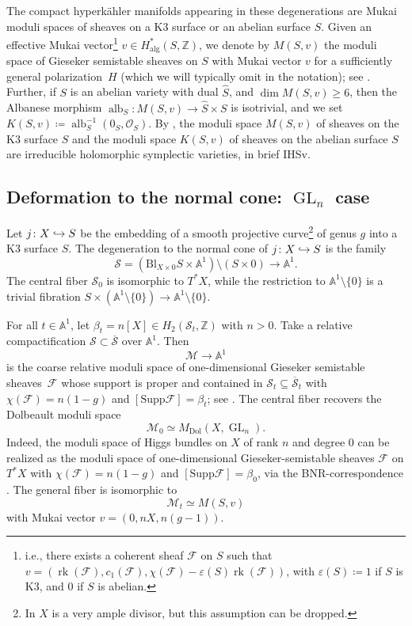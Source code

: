 \documentclass[11pt]{article}
\newcommand{\ie}{i.e.,\xspace}
\let\mathcal\mathscr
\let\epsilon\varepsilon
\newcommand\hto{\mathrel{\lhook\joinrel\to}}
\DeclareMathOperator{\rk}{rk}
\theoremstyle{definition}
\newcommand{\Aff}{\mathbb{A}}
\newcommand{\ZZ}{\mathbb{Z}}
\newcommand{\alb}{\operatorname{alb}}
\newcommand{\Gl}{\operatorname{GL}}
\newcommand{\MDolGl}{{M}_{\mathrm{Dol}}(X, \Gl_n)}
\newcommand{\Mukai}{M(S, v)}
\newcommand{\Kumm}{K(S, v)}
\begin{document}
The compact hyperkähler manifolds appearing in these degenerations are Mukai moduli spaces of sheaves on a K3 surface or an abelian surface $S$. Given an effective Mukai vector\footnote{\ie there exists a coherent sheaf $\mathcal{F}$ on $S$ such that $v = (\rk(\mathcal{F}), c_1(\mathcal{F}), \chi(\mathcal{F})-\epsilon(S)\rk(\mathcal{F}))$, with $\epsilon(S)\coloneqq 1$ if $S$ is K3, and $0$ if $S$ is abelian.} $v \in H^{*}_{\mathrm{alg}}(S, \ZZ)$, we denote by $\Mukai$ the moduli space of Gieseker semistable sheaves on $S$ with Mukai vector $v$
for a sufficiently general polariza\-tion~$H$ (which we will typically omit in the notation); see \cite[\S 1]{Simpson1994I}. Further, if $S$ is an abelian variety with dual $\hat{S}$, and $\dim \Mukai\geq 6$,
then the Albanese morphism
$\alb_S\colon \Mukai \to \hat{S} \times S$
is isotrivial, and we set
$\Kumm \coloneqq \alb_S^{-1}(0_S, \mathcal{O}_S)$. By \cite{PeregoRapagnetta18}, the moduli space $\Mukai$ of sheaves on the K3 surface $S$ and the moduli space $\Kumm$ of sheaves on the abelian surface $S$ are irreducible holomorphic symplectic varieties, in brief IHSv.

\subsection{Deformation to the normal cone: $\Gl_n$ case}
Let $j \colon X \hto S$ be the embedding of a smooth projective curve\footnote{In \cite{DEL97} $X$ is a very ample divisor, but this assumption can be dropped.} of genus $g$ into a K3 surface $S$. The degeneration to the normal cone of $j \colon X \hto S$ is the family
\[
\mathcal{S}=\left(\mathrm{Bl}_{X\times 0}S\times \Aff^1\right)\setminus \left( S\times 0\right)\to \Aff^1.
\]
The central fiber $\mathcal{S}_0$ is isomorphic to $T^*X$, while the restriction to $\Aff^1 \setminus \{0\}$ is a trivial fibration
$S\times (\Aff^1 \setminus \{0\})\to \Aff^1 \setminus \{0\}$.

For all $t\in \Aff^1$, let $\beta_t=n[X]\in H_2(\mathcal{S}_t,\ZZ)$ with $n>0$. Take a relative compactification $\mathcal{S} \subset \overline{\mathcal{S}}$ over $\Aff^1$. Then
\[
\mathcal{M} \to \Aff^1
\]
is the coarse relative moduli space of one-dimensional Gieseker semistable sheaves~$\mathcal{F}$ whose support is proper and contained in $\mathcal{S}_t \subseteq \overline{\mathcal{S}}_t$ with $\chi(\mathcal{F})=n(1-g)$ and $[\mathrm{Supp}\mathcal{F}]=\beta_t$; see \cite[Th.\,1.21]{Simpson1994I}. The central fiber recovers the Dolbeault moduli space
\[
\mathcal{M}_0 \simeq \MDolGl.
\]
Indeed, the moduli space of Higgs bundles on $X$ of rank $n$ and degree $0$ can be realized as the moduli space of one-dimensional Gieseker-semistable sheaves $\mathcal{F}$ on $T^*X$ with $\chi(\mathcal{F})=n(1-g)$ and $[\mathrm{Supp}\mathcal{F}]=\beta_0$, via the BNR-correspondence \cite{BNR89}. The general fiber is isomorphic to
\[
\mathcal{M}_t \simeq M(S,v)
\]
with Mukai vector $v=(0,nX, n(g-1))$.
\end{document}
